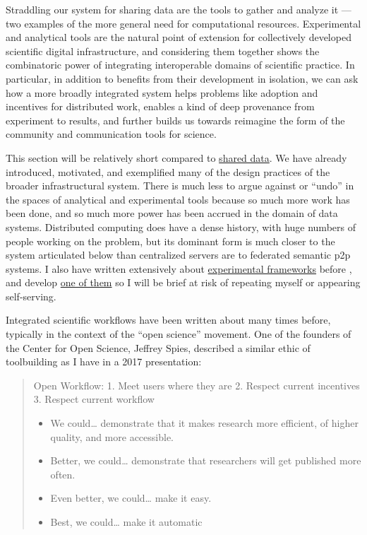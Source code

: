 \documentclass[10pt]{article}
\begin{document}
\begin{multicols}{2}
 Straddling our system for sharing data are the tools to
gather and analyze it --- two examples of the more general need for
computational resources. Experimental and analytical tools are the
natural point of extension for collectively developed scientific digital
infrastructure, and considering them together shows the combinatoric
power of integrating interoperable domains of scientific practice. In
particular, in addition to benefits from their development in isolation,
we can ask how a more broadly integrated system helps problems like
adoption and incentives for distributed work, enables a kind of deep
provenance from experiment to results, and further builds us towards
reimagine the form of the community and communication tools for science.

This section will be relatively short compared to
\protect\hyperlink{shared-data}{shared data}. We have already
introduced, motivated, and exemplified many of the design practices of
the broader infrastructural system. There is much less to argue against
or ``undo'' in the spaces of analytical and experimental tools because
so much more work has been done, and so much more power has been accrued
in the domain of data systems. Distributed computing does have a dense
history, with huge numbers of people working on the problem, but its
dominant form is much closer to the system articulated below than
centralized servers are to federated semantic p2p systems. I also have
written extensively about
\protect\hyperlink{experimental-frameworks}{experimental frameworks}
before \cite{saundersAutopilotAutomatingBehavioral2019} , and
develop \href{https://docs.auto-pi-lot.com/en/latest/}{one of them} so I
will be brief at risk of repeating myself or appearing self-serving.

Integrated scientific workflows have been written about many times
before, typically in the context of the ``open science'' movement. One
of the founders of the Center for Open Science, Jeffrey Spies, described
a similar ethic of toolbuilding as I have in a 2017 presentation:

\begin{quote}
Open Workflow: 1. Meet users where they are 2. Respect current
incentives 3. Respect current workflow

\begin{itemize}

\item
  We could\ldots{} demonstrate that it makes research more efficient, of
  higher quality, and more accessible.
\item
  Better, we could\ldots{} demonstrate that researchers will get
  published more often.
\item
  Even better, we could\ldots{} make it easy.
\item
  Best, we could\ldots{} make it automatic \cite{spiesWorkflowCentricApproachIncreasing2017} 
\end{itemize}
\end{quote}


\end{multicols}
\end{document}
